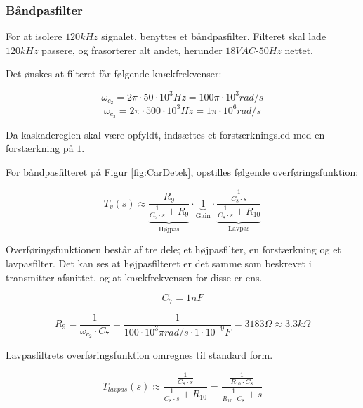 \subsubsection{Båndpasfilter}

For at isolere $120kHz$ signalet, benyttes et båndpasfilter. Filteret skal lade $120kHz$ passere, og frasorterer alt andet, herunder $18VAC$-$50Hz$ nettet.

Det ønskes at filteret får følgende knækfrekvenser:

\begin{displaymath}
\omega_{c_{2}} = 2 \pi \cdot 50 \cdot 10^3 Hz = 100\pi \cdot 10^{3} rad/s
\end{displaymath}
\begin{displaymath}
\omega_{c_{3}} = 2 \pi \cdot 500 \cdot 10^3 Hz = 1\pi \cdot 10^{6} rad/s
\end{displaymath}

Da kaskadereglen skal være opfyldt, indsættes et forstærkningsled med en forstærkning på $1$.

For båndpasfilteret på Figur \ref{fig:CarDetek}, opstilles følgende overføringsfunktion:

\begin{displaymath}
T_{v}(s)\approx \underbrace{\dfrac{R_{9}}{\tfrac{1}{C_{7}\cdot s}+R_{9}}}_\text{Højpas} \cdot
\underbrace{1}_\text{Gain} \cdot
\underbrace{\dfrac{ \tfrac{ 1 }{C_{8}\cdot s}}{ \tfrac{ 1 }{C_{8}\cdot s }+ R_{10}}}_\text{Lavpas}
\end{displaymath}

Overføringsfunktionen består af tre dele; et højpasfilter, en forstærkning og et lavpasfilter. Det kan ses at højpasfilteret er det samme som beskrevet i transmitter-afsnittet, og at knækfrekvensen for disse er ens.

\begin{displaymath}
C_{7} = 1nF
\end{displaymath}

\begin{displaymath}
R_{9} = \dfrac{1}{\omega_{c_{2}} \cdot C_{7}} = \dfrac{1}{100\cdot 10^{3}\pi rad/s \cdot 1\cdot 10^{-9}F} = 3183 \Omega \approx 3.3k\Omega
\end{displaymath}

Lavpasfiltrets overføringsfunktion omregnes til standard form.

\begin{displaymath}
T_{lavpas}(s)\approx \dfrac{ \tfrac{ 1 }{C_{8}\cdot s}}{ \tfrac{ 1 }{C_{8}\cdot s }+ R_{10}} = 
\dfrac{ \tfrac{ 1 }{ R_{10} \cdot C_{8}} }{ \tfrac{ 1 }{ R_{10} \cdot C_{8}} +s }
\end{displaymath}

